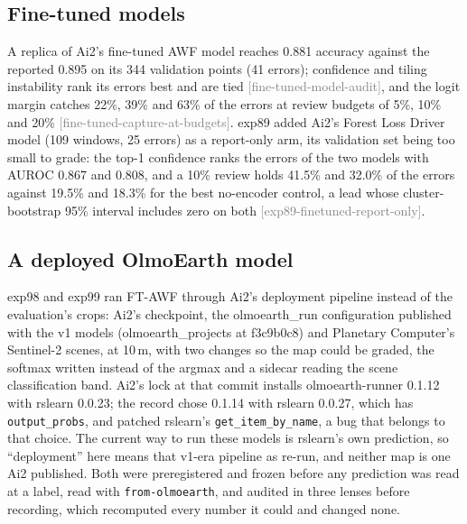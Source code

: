 \documentclass[11pt,a4paper]{article}
\newcommand{\claim}[1]{{\scriptsize\textsf{\textcolor{gray}{[#1]}}}}
\newcommand{\code}[1]{\texttt{#1}}
\begin{document}
\subsection{Fine-tuned models}
\label{sec:res-finetuned}

A replica of Ai2's fine-tuned AWF model reaches 0.881 accuracy against the reported 0.895 on its 344 validation points
(41 errors); confidence and tiling instability rank its errors best and are tied \claim{fine-tuned-model-audit}, and
the logit margin catches 22\%, 39\% and 63\% of the errors at review budgets of 5\%, 10\% and 20\%
\claim{fine-tuned-capture-at-budgets}. exp89 added Ai2's Forest Loss Driver model (109 windows, 25 errors) as a
report-only arm, its validation set being too small to grade: the top-1 confidence ranks the errors of the two models
with AUROC 0.867 and 0.808, and a 10\% review holds 41.5\% and 32.0\% of the errors against 19.5\% and 18.3\% for the
best no-encoder control, a lead whose cluster-bootstrap 95\% interval includes zero on both
\claim{exp89-finetuned-report-only}.

\subsection{A deployed OlmoEarth model}
\label{sec:res-deployed}

exp98 and exp99 ran FT-AWF through Ai2's deployment pipeline instead of the evaluation's crops: Ai2's checkpoint, the
olmoearth\_run configuration published with the v1 models (olmoearth\_projects at f3c9b0c8) and Planetary Computer's
Sentinel-2 scenes, at 10\,m, with two changes so the map could be graded, the softmax written instead of the argmax
and a sidecar reading the scene classification band. Ai2's lock at that commit installs olmoearth-runner 0.1.12 with
rslearn 0.0.23; the record chose 0.1.14 with rslearn 0.0.27, which has \code{output\_probs}, and patched rslearn's
\code{get\_item\_by\_name}, a bug that belongs to that choice. The current way to run these models is rslearn's own
prediction, so ``deployment'' here means that v1-era pipeline as re-run, and neither map is one Ai2 published. Both
were preregistered and frozen before any prediction was read at a label, read with \code{from-olmoearth}, and audited
in three lenses before recording, which recomputed every number it could and changed none.
\end{document}
